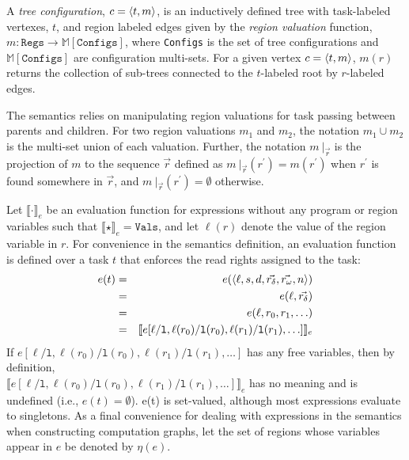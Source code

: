 A \emph{tree configuration}, $c = \langle t,m \rangle $, is an inductively defined tree with task-labeled vertexes, $t$, and region labeled edges given by the \emph{region valuation} function, $m : \texttt{Regs} \rightarrow \mathbb{M}[\texttt{Configs}]$, where \texttt{Configs} is the set of tree configurations and $\mathbb{M}[\texttt{Configs}]$ are configuration multi-sets. For a given vertex $c = \langle t,m \rangle $, $m(r)$ returns the collection of sub-trees connected to the $t$-labeled root by $r$-labeled edges.

The semantics relies on manipulating region valuations for task passing between parents and children. For two region valuations $m_1$ and $m_2$, the notation $m_1 \cup m_2$ is the multi-set union of each valuation. Further, the notation $m\ |_{\vec{r}}$ is the projection of $m$ to the sequence $\vec{r}$ defined as $m\ |_{\vec{r}}(r^\prime) = m(r^\prime)$  when $r^\prime$ is found somewhere in $\vec{r}$, and $m\ |_{\vec{r}}(r^\prime) = \emptyset$ otherwise. 

Let $\llbracket \cdot \rrbracket_e$ be an evaluation function for expressions without any program or region variables such that $\llbracket \star \rrbracket_e = \texttt{Vals}$, and let $\ell(r)$ denote the value of the region variable in $r$. For convenience in the semantics definition, an evaluation function is defined over a task $t$ that enforces the read rights assigned to the task:
\begin{eqnarray*}
  e(t) &=& e(\tuple{\ell, s, d, \vec{r_\delta}, \vec{r_\omega}, n}) \\
  &=& e(\ell, \vec{r_\delta}) \\
  &=& e(\ell, r_0, r_1, \ldots) \\
  &=& \llbracket e[\ell / \texttt{l},\ell(r_0) / \texttt{l}(r_0), \ell(r_1) / \texttt{l}(r_1), \ldots]  \rrbracket_e
  \end{eqnarray*}
If $e[\ell / \texttt{l},\ell(r_0) / \texttt{l}(r_0), \ell(r_1) / \texttt{l}(r_1), \ldots]$ has any free variables, then by definition, \\
$\llbracket e[\ell / \texttt{l},\ell(r_0) / \texttt{l}(r_0), \ell(r_1) / \texttt{l}(r_1), \ldots]  \rrbracket_e$ has no meaning and is undefined (i.e., $e(t) = \emptyset$). e(t) is set-valued, although most expressions evaluate to singletons. As a final convenience for dealing with expressions in the semantics when constructing computation graphs, let the set of regions whose variables appear in $e$ be denoted by $\eta(e)$. 

